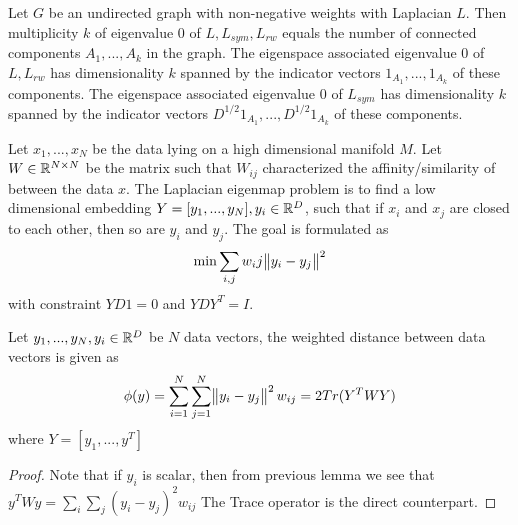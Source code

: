 \begin{refsection}
\begin{corollary}\cite{von2007tutorial}
	Let $G$ be an undirected graph with non-negative weights with Laplacian $L$. Then multiplicity $k$ of eigenvalue 0 of $L,L_{sym},L_{rw}$ equals the number of connected components $A_1,...,A_k$ in the graph. The eigenspace associated eigenvalue 0 of $L,L_{rw}$ has dimensionality $k$ spanned by the indicator vectors $1_{A_1},...,1_{A_k}$ of these components. The eigenspace associated eigenvalue 0 of $L_{sym}$ has dimensionality $k$ spanned by the indicator vectors $D^{1/2}1_{A_1},...,D^{1/2}1_{A_k}$ of these components.   
\end{corollary}


\begin{definition}\cite[140]{vidal2016generalized}
Let $x_1,...,x_N$ be the data lying on a high dimensional manifold $M$. Let $W\in \mathbb{R}^{N\times N}$ be the matrix such that $W_{ij}$ characterized the affinity/similarity of between the data $x$.  The Laplacian eigenmap problem is to find a low dimensional embedding $Y = [y_1,...,y_N], y_i\in \mathbb{R}^D$, such that if $x_i$ and $x_j$ are closed to each other, then so are $y_i$ and $y_j$. The goal is formulated as
$$\min \sum_{i,j} w_ij\norm{y_i-y_j}^2$$
with constraint $YD1 = 0$ and $YDY^T = I$. 	
\end{definition}



\begin{lemma}
	
Let $y_1,...,y_N,y_i\in \mathbb{R}^D$ be $N$ data vectors, the weighted distance between data vectors is given as
$$\phi(y) = \sum_{i=1}^N\sum_{j=1}^N \norm{y_i-y_j}^2w_{ij} = 2Tr(Y^TWY)$$
where $Y=[y_1,...,y^T]$
\end{lemma}
\begin{proof}
Note that if $y_i$ is scalar, then from previous lemma we see that $y^TWy = \sum_i\sum_j(y_i-y_j)^2w_{ij}$
The Trace operator is the direct counterpart.
\end{proof}


\begin{remark}[implications]
	
\end{remark}




\end{refsection}
